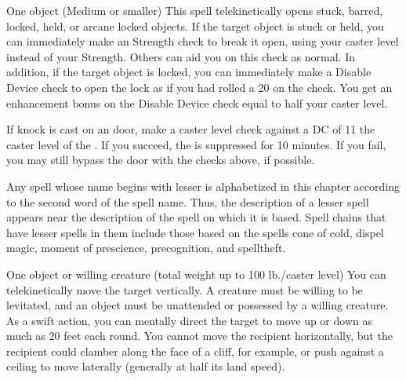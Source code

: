 \begin{spellheader}
    \spellrng{\rngclose}
\end{spellheader}
\begin{spelleffects}
    \begin{spelltarget}{One object (Medium or smaller)}
        \spelleffect This spell telekinetically opens stuck, barred, locked, held, or arcane locked objects. If the target object is stuck or held, you can immediately make an Strength check to break it open, using your caster level instead of your Strength. Others can aid you on this check as normal. In addition, if the target object is locked, you can immediately make a Disable Device check to open the lock as if you had rolled a 20 on the check. You get an enhancement bonus on the Disable Device check equal to half your caster level.
    \end{spelltarget}
\end{spelleffects}
\begin{spellfooter}
    \spellnotes If knock is cast on an  door, make a caster level check against a DC of 11 \add the caster level of the . If you succeed, the  is suppressed for 10 minutes. If you fail, you may still bypass the door with the checks above, if possible.

    \par Any spell whose name begins with lesser is alphabetized in this chapter according to the second word of the spell name. Thus, the description of a lesser spell appears near the description of the spell on which it is based. Spell chains that have lesser spells in them include those based on the spells cone of cold, dispel magic, moment of prescience, precognition, and spelltheft.
\end{spellfooter}

\begin{spellheader}
    \spellrng{\rngclose}
    \spelldur{\durshort \dismissable}
\end{spellheader}
\begin{spelleffects}
    \begin{spelltarget}{One object or willing creature (total weight up to 100 lb./caster level)}
        \spelleffect You can telekinetically move the target vertically. A creature must be willing to be levitated, and an object must be unattended or possessed by a willing creature. As a swift action, you can mentally direct the target to move up or down as much as 20 feet each round. You cannot move the recipient horizontally, but the recipient could clamber along the face of a cliff, for example, or push against a ceiling to move laterally (generally at half its land speed).
    \end{spelltarget}
\end{spelleffects}
\begin{spellfooter}
    
\end{spellfooter}

